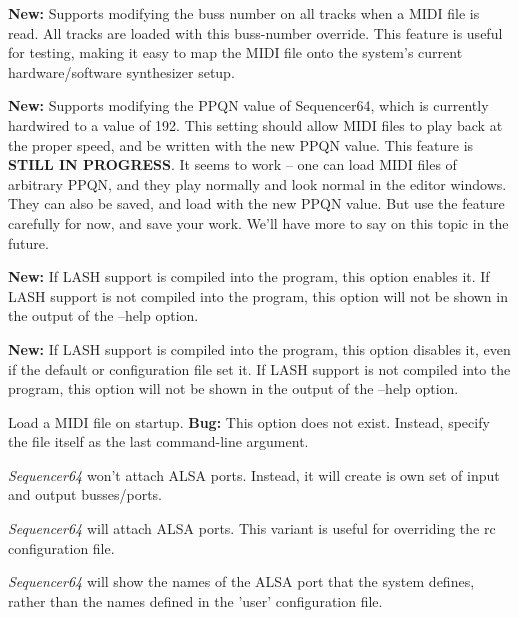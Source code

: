       \textbf{New:}
      Supports modifying the buss number on all tracks when a MIDI file is
      read.  All tracks are loaded with this buss-number override.  This
      feature is useful for testing, making it easy to map the MIDI file onto
      the system's current hardware/software synthesizer setup.

      \textbf{New:}
      Supports modifying the PPQN value of Sequencer64, which is currently
      hardwired to a value of 192.  This setting should allow MIDI files to
      play back at the proper speed, and be written with the new PPQN value.
      This feature is \textbf{STILL IN PROGRESS}.
      It seems to work -- one can load MIDI files of arbitrary PPQN, and they
      play normally and look normal in the editor windows.  They can also be
      saved, and load with the new PPQN value. 
      But use the feature carefully for now, and save your work.
      We'll have more to say on this topic in the future.

      \textbf{New:}
      If LASH support is compiled into the program, this option
      enables it.
      If LASH support is not compiled into the program, this option will not
      be shown in the output of the --help option.

      \textbf{New:}
      If LASH support is compiled into the program, this option
      disables it, even if the default or configuration file set it.
      If LASH support is not compiled into the program, this option will not
      be shown in the output of the --help option.

      Load a MIDI file on startup.
      \textbf{Bug:}
      This option does not exist.
      Instead, specify the file itself as the last command-line argument.

      \textsl{Sequencer64} won't attach ALSA ports.
      Instead, it will create is own set of input and output busses/ports.

      \textsl{Sequencer64} will attach ALSA ports.
      This variant is useful for overriding the rc configuration file.

      \textsl{Sequencer64} will show the names of the ALSA port that the system
      defines, rather than the names defined in the 'user' configuration file.

